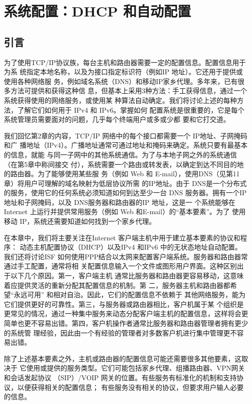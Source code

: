 \chapter{系统配置：DHCP 和自动配置}
\minitoc
\section{引言}
为了使用TCP/IP协议族，每台主机和路由器需要一定的配置信息。配置信息用于为系
统指定本地名称，以及为接口指定标识符（例如IP 地址）。它还用于提供或使用各种网络服
务，例如域名系统（DNS）和移动IP家乡代理。多年来，已有很多方法可提供和获得这种信
息，但基本上采用3种方法：手工获得信息，通过一个系统获得使用的网络服务，或使用某
种算法自动确定。我们将讨论上述的每种方法，了解它们如何用于 IPv4 和 IPv6。掌握如何
配置系统是很重要的，它是每个系统管理员需要面对的问题，几乎每个终端用户或多或少都
要和它打交道。

我们回忆第2章的内容，TCP/IP 网络中的每个接口都需要一个 IP地址、子网掩码和广
播地址（IPv4）。广播地址通常可通过地址和掩码来确定。系统只要有最基本的信息，就能
与同一子网中的其他系统通信。为了与本地子网之外的系统通信（在第5章中称间接交
付），系统需要一个路由或转发表，以确定到达不同目的地的路由器。为了能够使用某些服
务（例如 Web 和 E-mail），使用DNS（见第11章）将用户可理解的域名映射为低层协议所需
的IP地址。由于 DNS是一个分布式的服务，使用它的任何系统必须知道如何到达至少一台
DNS 服务器。拥有一个IP 地址和子网掩码，以及 DNS服务器和路由器的IP 地址，这是一
个系统能够在 Internet 上运行并提供常用服务（例如 Web 和E-mail）的“基本要素”。为了
使用移动 IP，系统还需要知道如何找到一个家乡代理。

在本章中，我们将主要关注在Internet 客户端主机中用于建立基本要素的协议和程序：
动态主机配置协议（DHCP）以及IPv4 和IPv6 中的无状态地址自动配置。我们还将讨论ISF
如何使用PPP结合以太网来配置客户端系统。服务器和路由器常通过手工配置，通常将相
关配置信息输入一个文件或图形用户界面。这种区别出于以下几个原因。第一，客户端主机
通常比服务器和路由器更容易移动，这意味着应提供灵活的重新分配其配置信息的机制。第
二，服务器主机和路由器都希望“永远可用” 和相对自治。因此，它们的配置信息不依赖于
其他网络服务，能为它们提供更好的可靠性。第三，与服务器或路由器相比，客户机属于某
个组织是更常见的情况，通过一种集中服务来动态分配客户端主机的配置信息，这样将会更
简单也更不容易出错。第四，客户机操作者通常比服务器和路由器管理者拥有更少的系统管
理经验，因此由一个有经验的管理者对多数客户机进行集中管理更不容易出错。

除了上述基本要素之外，主机或路由器的配置信息可能还需要很多其他要素，这取决于
它使用或提供的服务类型。它们可能包括家乡代理、组播路由器、VPN网关和会话发起协议
（SIP）/VOIP 网关的位置。有些服务有标准化的机制和支持协议，以便获得相关的配置信息；
有些服务没有相关的协议，但要求用户输人必要的信息。

